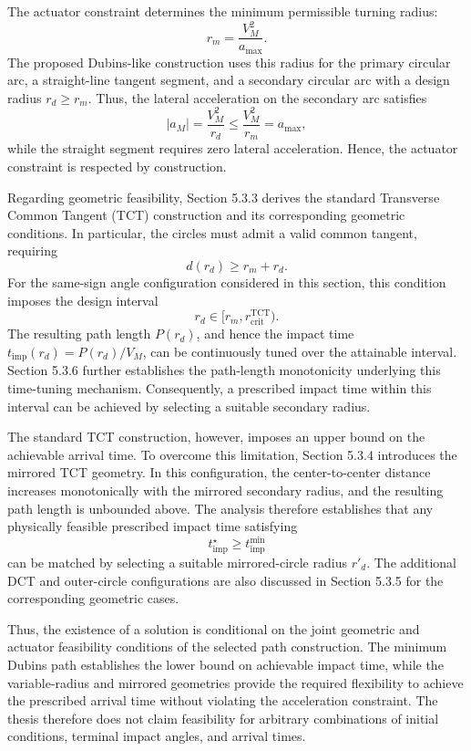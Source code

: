 \documentclass[11pt,a4paper]{article}
\begin{document}
The actuator constraint determines the minimum permissible turning radius:
\[
r_m=\frac{V_M^2}{a_{\max}}.
\]
The proposed Dubins-like construction uses this radius for the primary circular arc, a straight-line tangent segment, and a secondary circular arc with a design radius $r_d\geq r_m$. Thus, the lateral acceleration on the secondary arc satisfies
\[
|a_M|=\frac{V_M^2}{r_d}
\leq \frac{V_M^2}{r_m}=a_{\max},
\]
while the straight segment requires zero lateral acceleration. Hence, the actuator constraint is respected by construction.

Regarding geometric feasibility, Section 5.3.3 derives the standard Transverse Common Tangent (TCT) construction and its corresponding geometric conditions. In particular, the circles must admit a valid common tangent, requiring
\[
d(r_d)\geq r_m+r_d.
\]
For the same-sign angle configuration considered in this section, this condition imposes the design interval
\[
r_d\in[r_m,r_{\mathrm{crit}}^{\mathrm{TCT}}).
\]
The resulting path length $P(r_d)$, and hence the impact time $t_{\mathrm{imp}}(r_d)=P(r_d)/V_M$, can be continuously tuned over the attainable interval. Section 5.3.6 further establishes the path-length monotonicity underlying this time-tuning mechanism. Consequently, a prescribed impact time within this interval can be achieved by selecting a suitable secondary radius.

The standard TCT construction, however, imposes an upper bound on the achievable arrival time. To overcome this limitation, Section 5.3.4 introduces the mirrored TCT geometry. In this configuration, the center-to-center distance increases monotonically with the mirrored secondary radius, and the resulting path length is unbounded above. The analysis therefore establishes that any physically feasible prescribed impact time satisfying
\[
t^\star_{\mathrm{imp}}\geq t_{\mathrm{imp}}^{\min}
\]
can be matched by selecting a suitable mirrored-circle radius $r'_d$. The additional DCT and outer-circle configurations are also discussed in Section 5.3.5 for the corresponding geometric cases.

Thus, the existence of a solution is conditional on the joint geometric and actuator feasibility conditions of the selected path construction. The minimum Dubins path establishes the lower bound on achievable impact time, while the variable-radius and mirrored geometries provide the required flexibility to achieve the prescribed arrival time without violating the acceleration constraint. The thesis therefore does not claim feasibility for arbitrary combinations of initial conditions, terminal impact angles, and arrival times.
\end{document}
